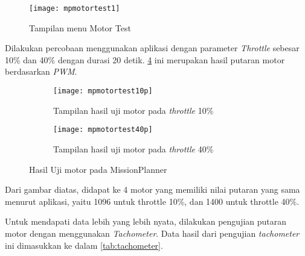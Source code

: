\begin{figure}[H]
	\centering
	\texttt{[image: mpmotortest1]}
	\caption{Tampilan menu Motor Test}
	\label{fig:mpmotortest1}
\end{figure}

Dilakukan percobaan menggunakan aplikasi dengan parameter \textit{Throttle} sebesar 10\% dan 40\% dengan durasi 20 detik. \cref{fig:motortest1040} ini merupakan hasil putaran motor berdasarkan \textit{PWM}.

\begin{figure}[H]
	\centering
	\begin{subfigure}[b]{1\textwidth}
		\centering
		\texttt{[image: mpmotortest10p]}
		\caption{Tampilan hasil uji motor pada \textit{throttle} 10\%}
		\label{fig:mpmotortest40}
	\end{subfigure}
	\hfill
	\begin{subfigure}[b]{1\textwidth}
		\centering
		\texttt{[image: mpmotortest40p]}
		\caption{Tampilan hasil uji motor pada \textit{throttle} 40\%}
		\label{fig:mpmotortest10}
	\end{subfigure}
	\caption{Hasil Uji motor pada MissionPlanner}
	\label{fig:motortest1040}
\end{figure}

Dari gambar diatas, didapat ke 4 motor yang  memiliki nilai putaran yang sama menurut aplikasi, yaitu 1096 untuk throttle 10\%, dan 1400 untuk throttle 40\%.

Untuk mendapati data lebih yang lebih nyata, dilakukan pengujian putaran motor dengan menggunakan \textit{Tachometer}. Data hasil dari pengujian \textit{tachometer} ini dimasukkan ke dalam \cref{tab:tachometer}.

